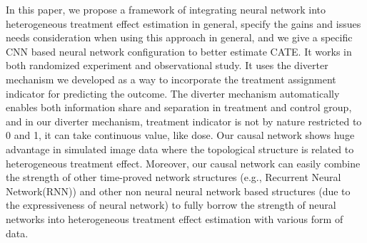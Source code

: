 \documentclass[11pt,paper=letter]{scrartcl}
\newcommand\hz[1]{\textcolor{black}{#1}}
\begin{document}

In this paper, we propose a framework of integrating neural network into heterogeneous treatment effect estimation in general, specify the gains and issues needs consideration when using this approach in general, and we give a specific CNN based neural network configuration to better estimate CATE. It works in both randomized experiment and observational study. It uses the diverter mechanism we developed as a way to incorporate the treatment assignment indicator for predicting the outcome. The diverter mechanism automatically enables both information share and separation in treatment and control group, and in our diverter mechanism, treatment indicator is not by nature restricted to 0 and 1, it can take continuous value, like dose. Our causal network shows huge advantage in simulated image data where the topological structure is related to heterogeneous treatment effect. Moreover, our causal network can easily combine the strength of other time-proved network structures (e.g., Recurrent Neural Network(RNN)) and other non neural neural network based structures (due to the expressiveness of neural network) to fully borrow the strength of neural networks into heterogeneous treatment effect estimation with various form of data.




\end{document}
